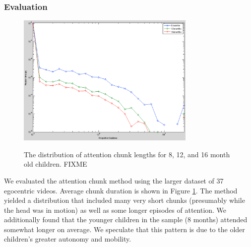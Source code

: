 \documentclass[10pt,letterpaper]{article}
\begin{document}
\subsubsection{Evaluation}

\begin{figure}[t]
\begin{center}
           \includegraphics[width=3.4in]{Image/log2}    \label{fig:buckets}
\caption{The distribution of attention chunk lengths for 8, 12, and 16 month old children. FIXME}
\label{fig:chunks}
\end{center}
\end{figure}

We evaluated the attention chunk method using the larger dataset of 37 egocentric videos. Average chunk duration is shown in Figure \ref{fig:chunks}. The method yielded a distribution that included many very short chunks (presumably while the head was in motion) as well as some longer episodes of attention. We additionally found that the younger children in the sample (8 months) attended somewhat longer on average. We speculate that this pattern is due to the older children's greater autonomy and mobility. 

\end{document}
